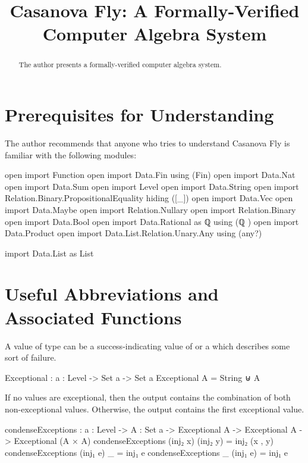 \documentclass{report}
\title{Casanova Fly: A Formally-Verified Computer Algebra System}
\begin{document}
\maketitle{}

\begin{abstract}
The author presents a formally-verified computer algebra system.
\end{abstract}

\chapter{Prerequisites for Understanding}
The author recommends that anyone who tries to understand Casanova Fly is familiar with the following modules:

\begin{code}
open import Function
open import Data.Fin using (Fin)
open import Data.Nat
open import Data.Sum
open import Level
open import Data.String
open import Relation.Binary.PropositionalEquality hiding ([_])
open import Data.Vec
open import Data.Maybe
open import Relation.Nullary
open import Relation.Binary
open import Data.Bool
open import Data.Rational
  as ℚ
  using (ℚ
        )
open import Data.Product
open import Data.List.Relation.Unary.Any using (any?)

import Data.List as List
\end{code}

\chapter{Useful Abbreviations and Associated Functions}
A value of type   can be a success-indicating value of  or a  which describes some sort of failure.

\begin{code}
Exceptional : {a : Level} -> Set a -> Set a
Exceptional A = String ⊎ A
\end{code}

If no values are exceptional, then the output contains the combination of both non-exceptional values.  Otherwise, the output contains the first exceptional value.

\begin{code}
condenseExceptions : {a : Level} ->
                     {A : Set a} ->
                     Exceptional A ->
                     Exceptional A ->
                     Exceptional (A × A)
condenseExceptions (inj₂ x) (inj₂ y) = inj₂ (x , y)
condenseExceptions (inj₁ e) _ = inj₁ e
condenseExceptions _ (inj₁ e) = inj₁ e
\end{code}
\end{document}
